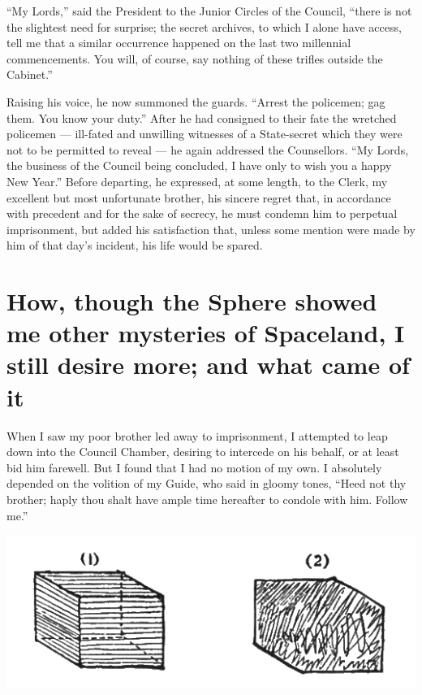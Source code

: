 \documentclass[12pt, a4paper, twoside]{memoir}
\begin{document}
``My Lords,'' said the President to the Junior Circles of the Council, ``there is
not the slightest need for surprise; the secret archives, to which I alone
have access, tell me that a similar occurrence happened on the last two
millennial commencements. You will, of course, say nothing of these trifles
outside the Cabinet.''

Raising his voice, he now summoned the guards. ``Arrest the policemen; gag
them. You know your duty.'' After he had consigned to their fate the wretched
policemen --- ill-fated and unwilling witnesses of a State-secret which they
were not to be permitted to reveal --- he again addressed the Counsellors. ``My
Lords, the business of the Council being concluded, I have only to wish you a
happy New Year.'' Before departing, he expressed, at some length, to the Clerk,
my excellent but most unfortunate brother, his sincere regret that, in
accordance with precedent and for the sake of secrecy, he must condemn him to
perpetual imprisonment, but added his satisfaction that, unless some mention
were made by him of that day's incident, his life would be spared.






\chapter{How, though the Sphere
showed me other mysteries of Spaceland, I still desire more; and what came of
it} 
When I saw my poor brother led away to imprisonment, I attempted to leap down
into the Council Chamber, desiring to intercede on his behalf, or at least bid
him farewell. But I found that I had no motion of my own. I absolutely
depended on the volition of my Guide, who said in gloomy tones, ``Heed not thy
brother; haply thou shalt have ample time hereafter to condole with him.
Follow me.'' 
\begin{center}
\includegraphics[trim=20mm 0mm 20mm 0mm,scale=0.6]{fig10}
\end{center}
\end{document}
